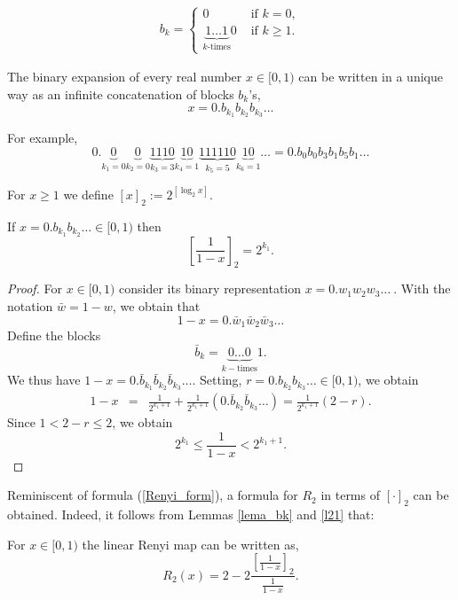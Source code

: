 \documentclass[letterpaper,10pt,reqno]{amsart}
\numberwithin{equation}{section}     %
\begin{document}
\begin{eqnarray*}
b_{k}=
\begin{cases}
0 & \text{ if  } k=0,  \\
\underbrace{1 \dots  1}_{k\textrm{-times}} 0 & \text{ if } k \geq 1.
\end{cases}
\end{eqnarray*}

\begin{lemma}\label{lema_bk}
The binary expansion of every real number $x\in [0,1)$ can be written in a unique way as an infinite concatenation of blocks $b_k$'s, 
\[
x=0.b_{k_1}b_{k_2}b_{k_3}\dots 
\]
\end{lemma}

For example, 
\begin{equation*}
0. \underbrace{0}_{k_1=0}\underbrace{0}_{k_2=0}\underbrace{1110}_{k_3=3}\underbrace{10}_{k_4=1} \underbrace{111110}_{k_5=5} \underbrace{10}_{k_6=1} \dots =0.b_0b_0b_3b_1b_5b_1\dots
\end{equation*}


For $x\geq 1$ we define $[x]_2:=2^{[\log_2 x]}$.

\begin{lemma} \label{l21}
If $x=0.b_{k_1}b_{k_2}\dots \in [0,1)$ then
\[
\left[\frac{1}{1-x}\right]_2=2^{k_1}.
\]
\end{lemma}
 

\begin{proof}
For $x\in [0,1)$ consider its binary representation  $x=0.w_1w_2w_3\dots \ $. With the notation $\bar w=1-w$, we obtain that
\[
1-x=0.\bar w_{1}\bar w_2\bar w_3\dots 
\]
Define the blocks 
\[
\bar b_k=\underbrace{0\dots 0}_{k-\textrm{times}}1.
\]
We thus have $1-x=0.\bar b_{k_1}\bar b_{k_2}\bar b_{k_3}\dots $. Setting,  $r=0. b_{k_2} b_{k_3}\dots\in [0,1)$,  we obtain
\begin{eqnarray*}
1-x&=&\frac{1}{2^{k_1+1}}+\frac{1}{2^{k_1+1}}\left(0.\bar b_{k_2}\bar b_{k_3}\dots \right)=\frac{1}{2^{k_1+1}}(2-r).
\end{eqnarray*}
Since $1<2-r\leq 2$, we obtain
\[
2^{k_1}\leq \frac{1}{1-x}<2^{k_1+1}.
\]
\end{proof}
Reminiscent of formula (\ref{Renyi_form}), a formula for $R_2$ in terms of $[\cdot]_2$ can be obtained. Indeed, it follows from Lemmas \ref{lema_bk} and \ref{l21} that:

\begin{lemma}
{{}{For}} $x \in [0,1)$ the linear Renyi map can be written as,
\begin{equation*}
R_2(x)=2-2\frac{\left[\frac{1}{1-x}\right]_2}{\frac{1}{1-x}}.
\end{equation*} 
\end{lemma}
\end{document}
